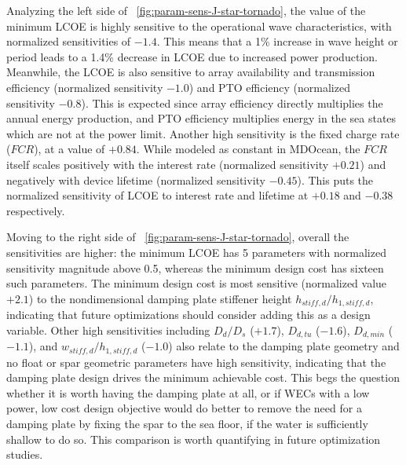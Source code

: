 Analyzing the left side of \figureautorefname~\ref{fig:param-sens-J-star-tornado}, the value of the minimum LCOE is highly sensitive to the operational wave characteristics, with normalized sensitivities of $-1.4$.
This means that a 1\% increase in wave height or period leads to a 1.4\% decrease in LCOE due to increased power production.
Meanwhile, the LCOE is also sensitive to array availability and transmission efficiency (normalized sensitivity $-1.0$) and PTO efficiency (normalized sensitivity $-0.8$).
This is expected since array efficiency directly multiplies the annual energy production, and PTO efficiency multiplies energy in the sea states which are not at the power limit.
Another high sensitivity is the fixed charge rate ($FCR$), at a value of $+0.84$.
While modeled as constant in MDOcean, the $FCR$ itself scales positively with the interest rate (normalized sensitivity $+0.21$) and negatively with device lifetime (normalized sensitivity $-0.45$).
This puts the normalized sensitivity of LCOE to interest rate and lifetime at $+0.18$ and $-0.38$ respectively.

Moving to the right side of \figureautorefname~\ref{fig:param-sens-J-star-tornado}, overall the sensitivities are higher: the minimum LCOE has 5 parameters with normalized sensitivity magnitude above 0.5, whereas the minimum design cost has sixteen such parameters.
The minimum design cost is most sensitive (normalized value $+2.1$) to the nondimensional damping plate stiffener height $h_{stiff,d}/h_{1,stiff,d}$, indicating that future optimizations should consider adding this as a design variable.
Other high sensitivities including $D_d/D_s$ ($+1.7$), $D_{d,tu}$ ($-1.6$), $D_{d,min}$ ($-1.1$), and $w_{stiff,d}/h_{1,stiff,d}$ ($-1.0$) also relate to the damping plate geometry and no float or spar geometric parameters have high sensitivity, indicating that the damping plate design drives the minimum achievable cost.
This begs the question whether it is worth having the damping plate at all, or if WECs with a low power, low cost design objective would do better to remove the need for a damping plate by fixing the spar to the sea floor, if the water is sufficiently shallow to do so.
This comparison is worth quantifying in future optimization studies. 

